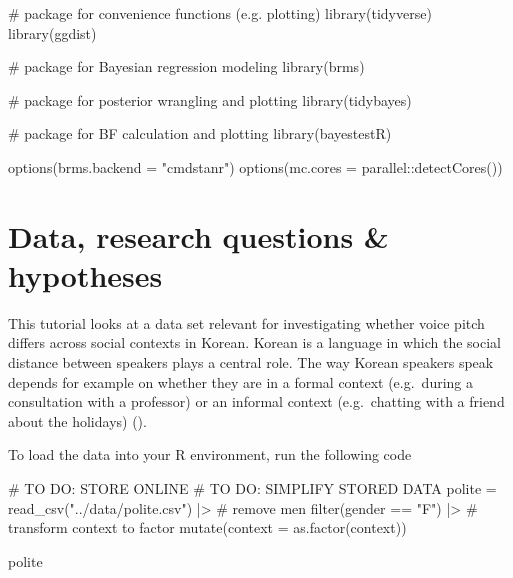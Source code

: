 \documentclass[
  doc,
  floatsintext,
  longtable,
  nolmodern,
  notxfonts,
  notimes,
  colorlinks=true,linkcolor=blue,citecolor=blue,urlcolor=blue]{apa7}
\newenvironment{Shaded}{\begin{snugshade}}{\end{snugshade}}
\newcommand{\AttributeTok}[1]{\textcolor[rgb]{0.40,0.45,0.13}{#1}}
\newcommand{\CommentTok}[1]{\textcolor[rgb]{0.37,0.37,0.37}{#1}}
\newcommand{\FunctionTok}[1]{\textcolor[rgb]{0.28,0.35,0.67}{#1}}
\newcommand{\NormalTok}[1]{\textcolor[rgb]{0.00,0.23,0.31}{#1}}
\newcommand{\OtherTok}[1]{\textcolor[rgb]{0.00,0.23,0.31}{#1}}
\newcommand{\SpecialCharTok}[1]{\textcolor[rgb]{0.37,0.37,0.37}{#1}}
\newcommand{\StringTok}[1]{\textcolor[rgb]{0.13,0.47,0.30}{#1}}
\begin{document}
\begin{Shaded}
\begin{Highlighting}[]
\CommentTok{\# package for convenience functions (e.g. plotting)}
\FunctionTok{library}\NormalTok{(tidyverse)}
\FunctionTok{library}\NormalTok{(ggdist)}

\CommentTok{\# package for Bayesian regression modeling}
\FunctionTok{library}\NormalTok{(brms)}

\CommentTok{\# package for posterior wrangling and plotting}
\FunctionTok{library}\NormalTok{(tidybayes)}

\CommentTok{\# package for BF calculation and plotting}
\FunctionTok{library}\NormalTok{(bayestestR)}

\FunctionTok{options}\NormalTok{(}\AttributeTok{brms.backend =} \StringTok{"cmdstanr"}\NormalTok{)}
\FunctionTok{options}\NormalTok{(}\AttributeTok{mc.cores =}\NormalTok{ parallel}\SpecialCharTok{::}\FunctionTok{detectCores}\NormalTok{())}
\end{Highlighting}
\end{Shaded}

\section{Data, research questions \&
hypotheses}\label{data-research-questions-hypotheses}

This tutorial looks at a data set relevant for investigating whether
voice pitch diﬀers across social contexts in Korean. Korean is a
language in which the social distance between speakers plays a central
role. The way Korean speakers speak depends for example on whether they
are in a formal context (e.g.~during a consultation with a professor) or
an informal context (e.g.~chatting with a friend about the holidays)
().

To load the data into your R environment, run the following code

\begin{Shaded}
\begin{Highlighting}[]
\CommentTok{\# TO DO: STORE ONLINE}
\CommentTok{\# TO DO: SIMPLIFY STORED DATA}
\NormalTok{polite }\OtherTok{=} \FunctionTok{read\_csv}\NormalTok{(}\StringTok{"../data/polite.csv"}\NormalTok{) }\SpecialCharTok{|\textgreater{}} 
  \CommentTok{\# remove men}
  \FunctionTok{filter}\NormalTok{(gender }\SpecialCharTok{==} \StringTok{"F"}\NormalTok{) }\SpecialCharTok{|\textgreater{}} 
  \CommentTok{\# transform context to factor}
  \FunctionTok{mutate}\NormalTok{(}\AttributeTok{context =} \FunctionTok{as.factor}\NormalTok{(context))}

\NormalTok{polite}
\end{Highlighting}
\end{Shaded}
\end{document}
